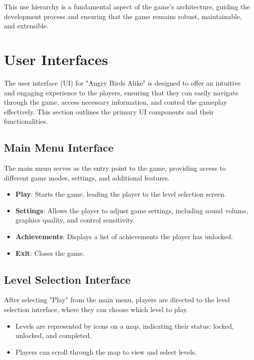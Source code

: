 \documentclass[12pt]{article}
\begin{document}
This use hierarchy is a fundamental aspect of the game's architecture, guiding the development process and ensuring that the game remains robust, maintainable, and extensible.

\section{User Interfaces}

The user interface (UI) for "Angry Birds Alike" is designed to offer an intuitive and engaging experience to the players, ensuring that they can easily navigate through the game, access necessary information, and control the gameplay effectively. This section outlines the primary UI components and their functionalities.

\subsection{Main Menu Interface}
The main menu serves as the entry point to the game, providing access to different game modes, settings, and additional features.
\begin{itemize}
    \item \textbf{Play}: Starts the game, leading the player to the level selection screen.
    \item \textbf{Settings}: Allows the player to adjust game settings, including sound volume, graphics quality, and control sensitivity.
    \item \textbf{Achievements}: Displays a list of achievements the player has unlocked.
    \item \textbf{Exit}: Closes the game.
\end{itemize}

\subsection{Level Selection Interface}
After selecting "Play" from the main menu, players are directed to the level selection interface, where they can choose which level to play.
\begin{itemize}
    \item Levels are represented by icons on a map, indicating their status: locked, unlocked, and completed.
    \item Players can scroll through the map to view and select levels.
\end{itemize}
\end{document}
